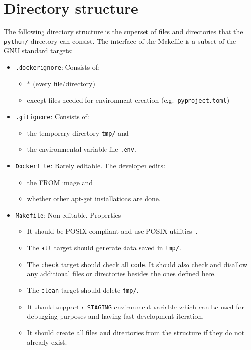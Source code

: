\documentclass[journal]{IEEEtran}
\begin{document}
\section{Directory structure}
The following directory structure is the superset of files and directories that the \texttt{python/} directory can consist.
The interface of the Makefile is a subset of the GNU standard targets:
\begin{itemize}
	\item \texttt{.dockerignore}: Consists of:
		\begin{itemize}
			\item * (every file/directory)
			\item except files needed for environment creation (e.g.\ \texttt{pyproject.toml})
		\end{itemize}
	\item \texttt{.gitignore}: Consists of:
		\begin{itemize}
			\item the temporary directory \texttt{tmp/} and
			\item the environmental variable file \texttt{.env}.
		\end{itemize}
	\item \texttt{Dockerfile}: Rarely editable. The developer edits:
		\begin{itemize}
			\item the FROM image and
			\item whether other apt-get installations are done.
		\end{itemize}
	\item \texttt{Makefile}: Non-editable. Properties~\cite{stallman1992gnu}:
		\begin{itemize}
			\item It should be POSIX-compliant and use POSIX utilities~\cite{lewine1991posix}.
			\item The \texttt{all} target should generate data saved in \texttt{tmp/}.
			\item The \texttt{check} target should check all \texttt{code}. It should also check and disallow any additional files or directories besides the ones defined here.
			\item The \texttt{clean} target should delete \texttt{tmp/}.
			\item It should support a \texttt{STAGING} environment variable which can be used for debugging purposes and having fast development iteration.
			\item It should create all files and directories from the structure if they do not already exist.

\end{itemize}
\end{itemize}
\end{document}

